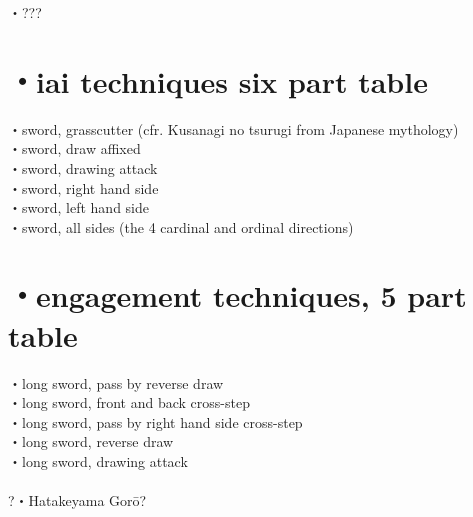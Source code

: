 \documentclass[dvipdfmx, a4paper, 12pt]{utarticle}
\begin{document}
\begin{CJK*}{UTF8}{min}
\begin{landscape}
\setcounter{section}{0}
\newpage
\pagestyle{empty}
・???\\
\section{・iai techniques six part table}
\noindent {}・sword, grasscutter (cfr. Kusanagi no tsurugi from Japanese mythology)\\
・sword, draw affixed\\
・sword, drawing attack\\
・sword, right hand side\\
・sword, left hand side\\
・sword, all sides (the 4 cardinal and ordinal directions)\\
\section{・engagement techniques, 5 part table}
\noindent {}・long sword, pass by reverse draw\\
・long sword, front and back cross-step\\
・long sword, pass by right hand side cross-step\\
・long sword, reverse draw\\
・long sword, drawing attack\\
\\
?・Hatakeyama Gor\={o}?

\end{landscape}
\end{CJK*}
\end{document}
